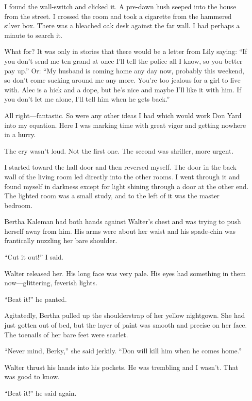 \documentclass{novel}
\begin{document}
I found the wall-switch and clicked it. A pre-dawn hush seeped into the house from the street. I crossed the room and took a cigarette from the hammered silver box. There was a bleached oak desk against the far wall. I had perhaps a minute to search it. 

What for? It was only in stories that there would be a letter from Lily saying: “If you don’t send me ten grand at once I’ll tell the police all I know, so you better pay up.” Or: “My husband is coming home any day now, probably this weekend, so don’t come sucking around me any more. You’re too jealous for a girl to live with. Alec is a hick and a dope, but he’s nice and maybe I’ll like it with him. If you don’t let me alone, I’ll tell him when he gets back.”

All right—fantastic. So were any other ideas I had which would work Don Yard into my equation. Here I was marking time with great vigor and getting nowhere in a hurry.

\scenestars

The cry wasn’t loud. Not the first one. The second was shriller, more urgent.

I started toward the hall door and then reversed myself. The door in the back wall of the living room led directly into the other rooms. I went through it and found myself in darkness except for light shining through a door at the other end. The lighted room was a small study, and to the left of it was the master bedroom.

Bertha Kaleman had both hands against Walter’s chest and was trying to push herself away from him. His arms were about her waist and his spade-chin was frantically nuzzling her bare shoulder.

“Cut it out!” I said.

Walter released her. His long face was very pale. His eyes had something in them now—glittering, feverish lights.

“Beat it!” he panted.

Agitatedly, Bertha pulled up the shoulderstrap of her yellow nightgown. She had just gotten out of bed, but the layer of paint was smooth and precise on her face. The toenails of her bare feet were scarlet.

“Never mind, Berky,” she said jerkily. “Don will kill him when he comes home.”

Walter thrust his hands into his pockets. He was trembling and I wasn’t. That was good to know.

“Beat it!” he said again.
\end{document}
